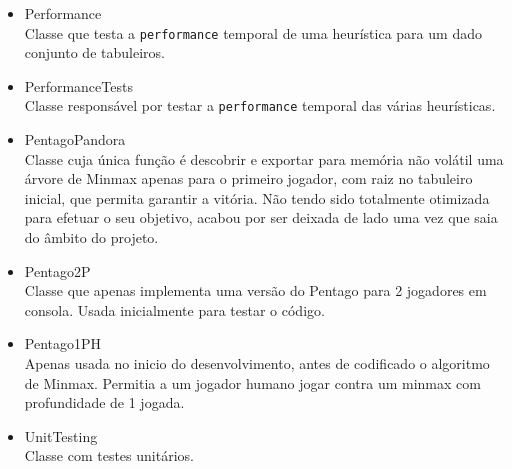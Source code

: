 \begin{itemize}
\item Performance \\
Classe que testa a \verb|performance| temporal de uma heurística para um dado conjunto de tabuleiros.

\item PerformanceTests \\
Classe responsável por testar a \verb|performance| temporal das várias heurísticas. 

\item PentagoPandora \\
\label{PandoraDescricao}
Classe cuja única função é descobrir e exportar para memória não volátil uma árvore de Minmax apenas para o primeiro jogador, com raiz no tabuleiro inicial, que permita garantir a vitória. Não tendo sido totalmente otimizada para efetuar o seu objetivo, acabou por ser deixada de lado uma vez que saia do âmbito do projeto.

\item Pentago2P \\
Classe que apenas implementa uma versão do Pentago para 2 jogadores em consola. Usada inicialmente para testar o código.

\item Pentago1PH \\
Apenas usada no inicio do desenvolvimento, antes de codificado o algoritmo de Minmax. Permitia a um jogador humano jogar contra um minmax com profundidade de 1 jogada.

\item UnitTesting \\
Classe com testes unitários. 

\end{itemize}
